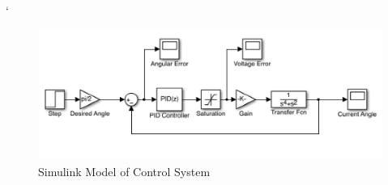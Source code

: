 \vspace{-6mm}
\begin{center}`
\begin{figure}[H]
\caption{Simulink Model of Control System}
\vspace{-4mm}
\centering
\includegraphics[scale = 0.8]{Simulink_ADCS_Model.png}
\end{figure}
\end{center}
\vspace{-5mm}
